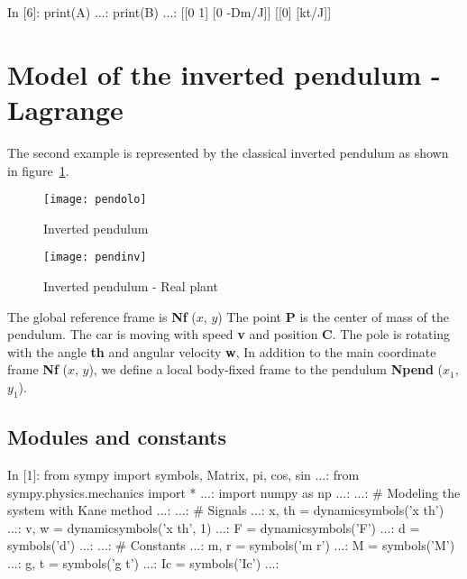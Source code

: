 \begin{code}
In [6]: print(A)
   ...: print(B)
   ...: 
[[0 1]
 [0 -Dm/J]]
[[0]
 [kt/J]]
\end{code}


\section{Model of the inverted pendulum - Lagrange}

The second example is represented by the classical inverted pendulum as shown 
in figure~\ref{F9a}.

\begin{figure}[htbp]	%
\centering
\vspace{8mm}
\texttt{[image: pendolo]}
\caption{Inverted pendulum}
\label{F9a}
\vspace{8mm}
\end{figure}

\begin{figure}[htbp]	%
\centering
\vspace{8mm}
\texttt{[image: pendinv]}
\caption{Inverted pendulum - Real plant}
\label{F9_a}
\vspace{8mm}
\end{figure}

The global reference frame is \textbf{Nf} ($x$, $y$)
The point \textbf{P} is the center of mass of the pendulum. The car is moving 
with speed \textbf{v} and position \textbf{C}.
The pole is rotating with the angle \textbf{th} and angular velocity 
\textbf{w}, 
In addition to the main coordinate frame \textbf{Nf} ($x$, $y$), we define a 
local body-fixed frame to the pendulum \textbf{Npend} ($x_1$, $y_1$).

\subsection{Modules and constants}
\begin{code}
In [1]: from sympy import symbols, Matrix, pi, cos, sin
   ...: from sympy.physics.mechanics import *
   ...: import numpy as np
   ...: 
   ...: # Modeling the system with Kane method
   ...: 
   ...: # Signals
   ...: x, th  = dynamicsymbols('x th')
   ...: v, w = dynamicsymbols('x th', 1)
   ...: F = dynamicsymbols('F')
   ...: d = symbols('d')
   ...: 
   ...: # Constants
   ...: m, r = symbols('m r')
   ...: M = symbols('M')
   ...: g, t = symbols('g t')
   ...: Ic = symbols('Ic')
   ...: 
\end{code}

